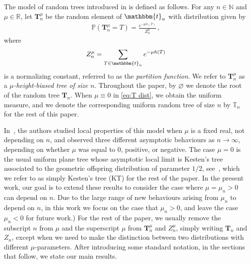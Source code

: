 \documentclass{article}
\newcommand{\bbt}{\mathbbm{t}}
\newcommand{\pr}{\mathbb{P}}								%
\newcommand{\Prob}[1]{\pr\left(#1\right)}					%
\newcommand{\1}{\mathbbm{1}}								%
\theoremstyle{definition}
\numberwithin{equation}{section}
\newcommand{\bT}{\mathbf T}
\newcommand{\T}{\mathbb T}
\newcommand{\N}{\mathbb N}
\newcommand{\R}{\mathbb R}
\begin{document}
The model of random trees introduced in \cite{durhuus2023trees} is defined as follows.
For any $n\in\N$ and $\mu\in\R$, let $\mathbf{T}_n^{\mu}$ {be the random element of $\bbt_n$} with distribution given by 
\begin{align}\label{eq:T dist}
    \Prob{\mathbf{T}_n^{\mu}=T}=\frac{e^{-{\mu} h(T)}}{Z_n^{\mu}}\,,
\end{align}
where
\begin{align}\label{eq:part fun}
    Z_n^{\mu}=\sum_{T\in\bbt_n}e^{-{\mu} h(T)}
\end{align}
is a normalizing constant, referred to as the \emph{partition function}. We refer to $\bT^\mu_n$ as a \emph{$\mu$-height-biased tree of size $n$}. {Throughout the paper, by $\varnothing$ we denote the root of the random tree $\bT_n$. When $\mu\equiv 0$ in \eqref{eq:T dist}, we obtain the uniform measure, and we denote the corresponding uniform random tree of size $n$ by $\T_n$ for the rest of this paper.} 

In~\cite{durhuus2023trees}, the authors studied local properties of this model when $\mu$ is a fixed real, not depending on $n$, and observed three different {asymptotic} behaviours {as $n \to \infty$}, depending on whether $\mu$ was equal to $0$, positive, or negative.
{The} case $\mu=0$ is the usual uniform plane tree whose asymptotic local limit is Kesten's tree associated to the geometric offspring distribution of parameter $1/2$, see~\cite{kesten1986subdiffusive}, which we refer to as simply Kesten's tree (KT) for the rest of the paper. 
In the present work, our goal is to {extend these results to} {consider} the case where $\mu=\mu_n{>0}$ can depend on $n$. Due to the large range of new behaviours arising from {$\mu_n$ to depend on $n$}, {in this work we} focus on the case that $\mu_n>0$, and leave the case $\mu_n<0$ for future work.) 
For the rest of the paper, we usually remove the subscript $n$ from $\mu$ and the superscript $\mu$ from $\bT_n^\mu$ and $Z_n^\mu$, {simply writing $\bT_n$ and $Z_n$,} except when we need to make the distinction between two distributions with different $\mu$-parameters. {After introducing some standard notation, in the sections that follow, we state our main results.}
\end{document}
